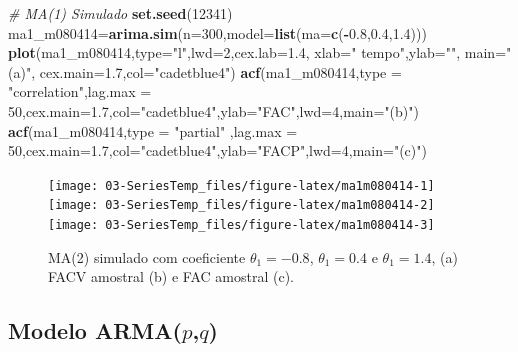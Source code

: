 \documentclass[
]{book}
\newenvironment{Shaded}{\begin{snugshade}}{\end{snugshade}}
\newcommand{\CommentTok}[1]{\textcolor[rgb]{0.56,0.35,0.01}{\textit{#1}}}
\newcommand{\DataTypeTok}[1]{\textcolor[rgb]{0.13,0.29,0.53}{#1}}
\newcommand{\DecValTok}[1]{\textcolor[rgb]{0.00,0.00,0.81}{#1}}
\newcommand{\FloatTok}[1]{\textcolor[rgb]{0.00,0.00,0.81}{#1}}
\newcommand{\KeywordTok}[1]{\textcolor[rgb]{0.13,0.29,0.53}{\textbf{#1}}}
\newcommand{\NormalTok}[1]{#1}
\newcommand{\OperatorTok}[1]{\textcolor[rgb]{0.81,0.36,0.00}{\textbf{#1}}}
\newcommand{\StringTok}[1]{\textcolor[rgb]{0.31,0.60,0.02}{#1}}
\theoremstyle{definition}
\theoremstyle{definition}
\theoremstyle{definition}
\theoremstyle{remark}
\begin{document}
\begin{Shaded}
\begin{Highlighting}[]
\CommentTok{# MA(1) Simulado}
\KeywordTok{set.seed}\NormalTok{(}\DecValTok{12341}\NormalTok{)}
\NormalTok{ma1_m080414=}\KeywordTok{arima.sim}\NormalTok{(}\DataTypeTok{n=}\DecValTok{300}\NormalTok{,}\DataTypeTok{model=}\KeywordTok{list}\NormalTok{(}\DataTypeTok{ma=}\KeywordTok{c}\NormalTok{(}\OperatorTok{-}\FloatTok{0.8}\NormalTok{,}\FloatTok{0.4}\NormalTok{,}\FloatTok{1.4}\NormalTok{)))}
\KeywordTok{plot}\NormalTok{(ma1_m080414,}\DataTypeTok{type=}\StringTok{"l"}\NormalTok{,}\DataTypeTok{lwd=}\DecValTok{2}\NormalTok{,}\DataTypeTok{cex.lab=}\FloatTok{1.4}\NormalTok{, }\DataTypeTok{xlab=}\StringTok{" tempo"}\NormalTok{,}\DataTypeTok{ylab=}\StringTok{""}\NormalTok{, }\DataTypeTok{main=}\StringTok{"(a)"}\NormalTok{, }\DataTypeTok{cex.main=}\FloatTok{1.7}\NormalTok{,}\DataTypeTok{col=}\StringTok{"cadetblue4"}\NormalTok{)}
\KeywordTok{acf}\NormalTok{(ma1_m080414,}\DataTypeTok{type =} \StringTok{"correlation"}\NormalTok{,}\DataTypeTok{lag.max =} \DecValTok{50}\NormalTok{,}\DataTypeTok{cex.main=}\FloatTok{1.7}\NormalTok{,}\DataTypeTok{col=}\StringTok{"cadetblue4"}\NormalTok{,}\DataTypeTok{ylab=}\StringTok{"FAC"}\NormalTok{,}\DataTypeTok{lwd=}\DecValTok{4}\NormalTok{,}\DataTypeTok{main=}\StringTok{"(b)"}\NormalTok{)}
\KeywordTok{acf}\NormalTok{(ma1_m080414,}\DataTypeTok{type =} \StringTok{"partial"}\NormalTok{ ,}\DataTypeTok{lag.max =} \DecValTok{50}\NormalTok{,}\DataTypeTok{cex.main=}\FloatTok{1.7}\NormalTok{,}\DataTypeTok{col=}\StringTok{"cadetblue4"}\NormalTok{,}\DataTypeTok{ylab=}\StringTok{"FACP"}\NormalTok{,}\DataTypeTok{lwd=}\DecValTok{4}\NormalTok{,}\DataTypeTok{main=}\StringTok{"(c)"}\NormalTok{)}
\end{Highlighting}
\end{Shaded}

\begin{figure}
\texttt{[image: 03-SeriesTemp\_files/figure-latex/ma1m080414-1]} \texttt{[image: 03-SeriesTemp\_files/figure-latex/ma1m080414-2]} \texttt{[image: 03-SeriesTemp\_files/figure-latex/ma1m080414-3]} \caption{MA(2) simulado com coeficiente $\theta_1=-0.8$, $\theta_1=0.4$ e $\theta_1=1.4$, (a) FACV amostral (b) e FAC amostral (c).}\label{fig:ma1m080414}
\end{figure}

\hypertarget{modelo-armapq}{%
\subsection{\texorpdfstring{Modelo ARMA(\(p\),\(q\))}{Modelo ARMA(p,q)}}\label{modelo-armapq}}
\end{document}
